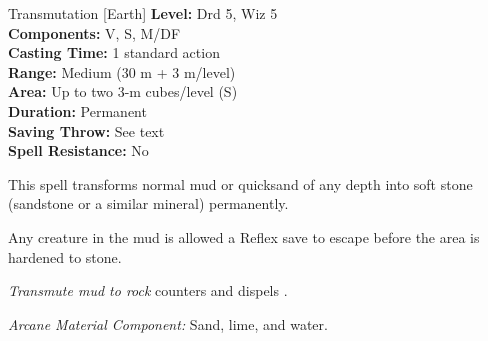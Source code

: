 {Transmutation [Earth]}
{
	\textbf{Level:}
	Drd 5, Wiz 5\\
	\textbf{Components:}
	V, S, M/DF\\
	\textbf{Casting Time:}
	1 standard action\\
	\textbf{Range:}
	Medium (30 m + 3 m/level)\\
	\textbf{Area:}
	Up to two 3-m cubes/level (S)\\
	\textbf{Duration:}
	Permanent\\
	\textbf{Saving Throw:}
	See text\\
	\textbf{Spell Resistance:}
	No\\
}
{
	This spell transforms normal mud or quicksand of any depth into soft stone (sandstone or a similar mineral) permanently.

	Any creature in the mud is allowed a Reflex save to escape before the area is hardened to stone.

	\emph{Transmute mud to rock} counters and dispels .

	\textit{Arcane Material Component:}
	Sand, lime, and water.

}
